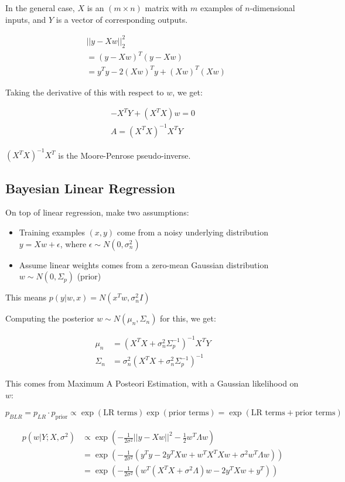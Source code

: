 \documentclass[a4paper]{article}
\begin{document}
In the general case, $X$ is an $(m \times n)$ matrix with $m$ examples of $n$-dimensional inputs, and $Y$ is a vector of corresponding outputs.

\begin{align*}
& ||y - X w||_2^2 \\
&= (y-Xw)^T (y-Xw) \\
&= y^T y - 2(Xw)^T y + (Xw)^T(Xw)
\end{align*}

Taking the derivative of this with respect to $w$, we get:

\begin{align*}
-X^T Y + (X^T X)w = 0 \\
A = (X^T X)^{-1} X^T Y
\end{align*}

$(X^T X)^{-1} X^T$ is the Moore-Penrose pseudo-inverse. 

\subsection{Bayesian Linear Regression}

On top of linear regression, make two assumptions: 

\begin{itemize}
	\item Training examples $(x,y)$ come from a noisy underlying distribution $y=Xw + \epsilon$, where $\epsilon \sim N(0, \sigma_n^2)$
	\item Assume linear weights comes from a zero-mean Gaussian distribution $w \sim N(0, \Sigma_p)$ (prior)
\end{itemize}

This means $p(y | w, x)=N(x^T w, \sigma_n^2 I)$

Computing the posterior $w \sim N(\mu_n, \Sigma_n)$ for this, we get:

\begin{align*}
\mu_n &= (X^T X + \sigma_n^2 \Sigma_p^{-1})^{-1} X^T Y \\
\Sigma_n &= \sigma_n^2 (X^T X + \sigma_n^2 \Sigma_p^{-1})^{-1}
\end{align*}

This comes from Maximum A Posteori Estimation, with a Gaussian likelihood on $w$:

$$p_{BLR} = p_{LR} \cdot p_{\text{prior}} \propto \exp(\text{LR terms}) \exp(\text{prior terms}) = \exp(\text{LR terms}+\text{prior terms})$$

\begin{align*}
p(w|Y; X, \sigma^2) &\propto \exp \left(-\frac{1}{2\sigma^2} ||y-Xw||^2 - \frac{1}{2} w^T \Lambda w \right) \\
&= \exp \left(-\frac{1}{2\sigma^2} (y^T y - 2y^T X w + w^T X^T X w + \sigma^2 w^T \Lambda w) \right) \\
&= \exp \left(-\frac{1}{2\sigma^2} (w^T(X^TX + \sigma^2 \Lambda)w -2 y^T Xw + y^T) \right)
\end{align*}
\end{document}
